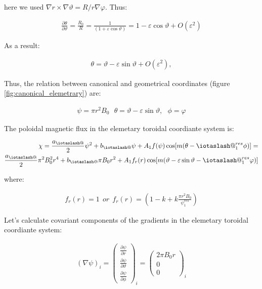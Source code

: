 \documentclass[11pt,a4paper,oneside]{article}
\makeatletter
\newcommand{\iotaslash}{{\mathpalette\iotaslash@\relax}}
\newcommand{\iotaslash@}[2]{
  \raisebox{-0.6\height}[0pt][0pt]{%
    \rotatebox[origin=Bl]{15}{$\m@th#1{\mkern-1mu\mathchar'26}$}%
  }%
  \mkern-9.5mu\nonscript\mkern-1mu
  \iota
  \mkern1mu
}
\makeatother
\begin{document}
here we used $\nabla r \times \nabla \vartheta=R/r\nabla \varphi$.  Thus:

\begin{align}
\frac{\partial \theta}{\partial \vartheta}= \frac{R_0}{R}=\frac{ 1}{(1+\varepsilon \cos{\vartheta})}=1-\varepsilon \cos{\vartheta}+O(\varepsilon^2)
\end{align} 

As a result:

\begin{align}
\theta = \vartheta-\varepsilon \sin{\vartheta}+O(\varepsilon^2), 
\end{align} 

Thus, the relation between canonical and geometrical coordinates (figure \ref{fig:canonical_elemetrary}) are:

\begin{align}
\psi = \pi r^2 B_0\ \ \ \theta = \vartheta-\varepsilon \sin{\vartheta},\ \ \  \phi=\varphi
\end{align} 

The poloidal magnetic flux in the elemetary toroidal coordiante system is:

\begin{align}
\chi=
\frac{a_\iotaslash}{2}\psi^2+b_\iotaslash\psi+A_1f(\psi)\cos[m(\theta-\iotaslash^{res}_1\phi)]=\\
\frac{a_\iotaslash}{2}\pi^2 B_0^2 r^4+b_\iotaslash\pi B_0 r^2+A_1f_r(r)\cos[m(\vartheta-\varepsilon \sin{\vartheta}-\iotaslash^{res}_1\varphi)]
\end{align}

where:

\begin{align}
f_r(r)=1\ \ or\ \ f_r(r)=\left(1-k+k\frac{\pi r^2 B_0}{\psi^{res}_1}\right)
\end{align}

Let's calculate covariant components of the gradients in the elemetary toroidal coordiante system:

\begin{align}
(\nabla \psi)_i= \begin{pmatrix}\frac{\partial \psi}{\partial r}\\\frac{\partial \psi}{\partial \vartheta}\\\frac{\partial \psi}{\partial \phi}\end{pmatrix}_i=\begin{pmatrix}2\pi B_0 r\\0\\0\end{pmatrix}_i
\end{align}
\end{document}
